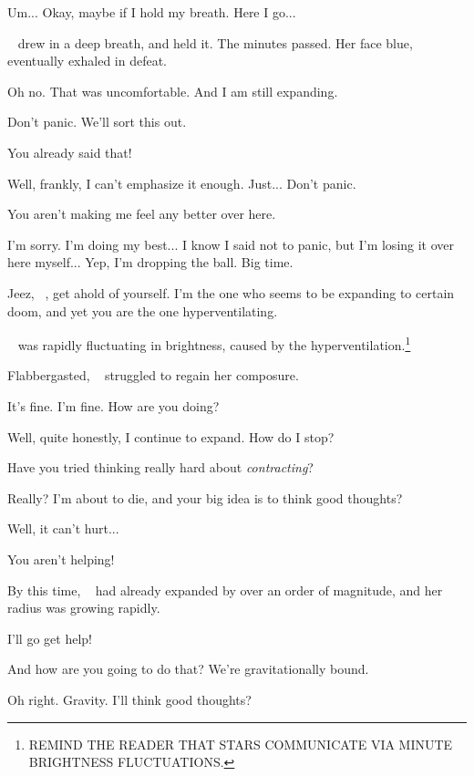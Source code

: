 \documentclass[main.tex]{subfiles}
\begin{document}
\newpara \Merope Um... Okay, maybe if I hold my breath.  Here I go...

\newpara \nar \rmmerope~ drew in a deep breath, and held it.  The minutes passed.  Her face blue, \rmmerope~ eventually exhaled in defeat.  

\newpara \Merope Oh no.  That was uncomfortable.  And I am still expanding.

\newpara \Maia Don't panic.  We'll sort this out.

\newpara \Merope You already said that!

\newpara \Maia Well, frankly, I can't emphasize it enough.  Just... Don't panic.

\newpara \Merope You aren't making me feel any better over here.

\newpara \Maia I'm sorry.  I'm doing my best... I know I said not to panic, but I'm losing it over here myself...  Yep, I'm dropping the ball.  Big time.

\newpara \Merope  Jeez, \rmmaia~, get ahold of yourself.  I'm the one who seems to be expanding to certain doom, and yet you are the one hyperventilating.

\mewpara \nar \rmmaia~ was rapidly fluctuating in brightness, caused by the hyperventilation.\footnote{REMIND THE READER THAT STARS COMMUNICATE VIA MINUTE BRIGHTNESS FLUCTUATIONS.}

\newpara \nar Flabbergasted, \rmmaia~ struggled to regain her composure.

\newpara \Maia It's fine.  I'm fine.  How are you doing?

\newpara \Merope Well, quite honestly, I continue to expand.  How do I stop?

\newpara \Maia Have you tried thinking really hard about \textit{contracting}?

\newpara \Merope Really?  I'm about to die, and your big idea is to think good thoughts?  

\newpara \Maia Well, it can't hurt...

\newpara \Merope You aren't helping!  

\newpara \nar By this time, \rmmerope~ had already expanded by over an order of magnitude, and her radius was growing rapidly.  

\newpara \Maia I'll go get help!

\newpara \Merope And how are you going to do that?  We're gravitationally bound.

\newpara \Maia Oh right.  Gravity.  I'll think good thoughts?
\end{document}
